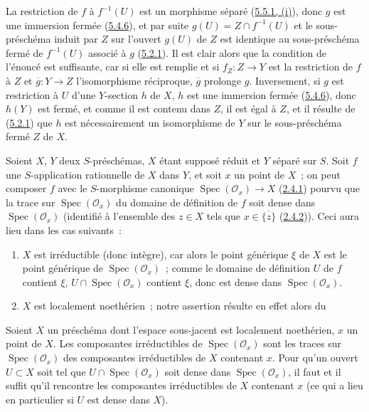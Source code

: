 La restriction de $f$ à $f^{-1}(U)$ est un morphisme séparé
(\hyperref[I.5.5.1-fr]{5.5.1, (i)}), donc $g$ est une immersion fermée
(\hyperref[I.5.4.6-fr]{5.4.6}), et par suite
$g(U)=Z\cap f^{-1}(U)$ et le sous-préschéma induit par $Z$ sur l'ouvert
$g(U)$ de $Z$ est identique au sous-préschéma fermé de $f^{-1}(U)$ associé à
$g$ (\hyperref[I.5.2.1-fr]{5.2.1}). Il est clair alors que la condition de
l'énoncé est suffisante, car si elle est remplie et si $f_Z:Z\to Y$ est la
restriction de $f$ à $Z$ et $\overline g:Y\to Z$ l'isomorphisme réciproque,
$\overline g$ prolonge $g$. Inversement, si $g$ est restriction à $U$ d'une
$Y$-section $h$ de $X$, $h$ est une immersion fermée
(\hyperref[I.5.4.6-fr]{5.4.6}), donc $h(Y)$ est fermé, et comme il est contenu
dans $Z$, il est égal à $Z$, et il résulte de
(\hyperref[I.5.2.1-fr]{5.2.1}) que $h$ est nécessairement un isomorphisme de
$Y$ sur le sous-préschéma fermé $Z$ de $X$.

\begin{env}[7.2.8]
\label{I.7.2.8-fr}
Soient $X$, $Y$ deux $S$-préschémas, $X$ étant supposé réduit et $Y$ séparé
sur $S$. Soit $f$ une $S$-application rationnelle de $X$ dans $Y$, et soit
$x$ un point de $X$~; on peut composer $f$ avec le $S$-morphisme canonique
$\operatorname{Spec}(\mathscr{O}_x)\to X$
(\hyperref[I.2.4.1-fr]{2.4.1}) pourvu que la trace sur
$\operatorname{Spec}(\mathscr{O}_x)$ du domaine de définition de $f$ soit
dense dans $\operatorname{Spec}(\mathscr{O}_x)$ (identifié à l'ensemble des
$z\in X$ tels que $x\in\overline{\{z\}}$
(\hyperref[I.2.4.2-fr]{2.4.2})). Ceci aura lieu dans les cas suivants~:
\begin{enumerate}
  \item[1\textsuperscript{o}] $X$ est irréductible (donc intègre), car alors
    le point générique $\xi$ de $X$ est le point générique de
    $\operatorname{Spec}(\mathscr{O}_x)$~; comme le domaine de définition $U$
    de $f$ contient $\xi$, $U\cap\operatorname{Spec}(\mathscr{O}_x)$ contient
    $\xi$, donc est dense dans $\operatorname{Spec}(\mathscr{O}_x)$.
  \item[2\textsuperscript{o}] $X$ est localement noethérien~; notre assertion
    résulte en effet alors du
\end{enumerate}
\end{env}

\begin{lemma}[7.2.8.1]
\label{I.7.2.8.1-fr}
Soient $X$ un préschéma dont l'espace sous-jacent est localement noethérien,
$x$ un point de $X$. Les composantes irréductibles de
$\operatorname{Spec}(\mathscr{O}_x)$ sont les traces sur
$\operatorname{Spec}(\mathscr{O}_x)$ des composantes irréductibles de $X$
contenant $x$. Pour qu'un ouvert $U\subset X$ soit tel que
$U\cap\operatorname{Spec}(\mathscr{O}_x)$ soit dense dans
$\operatorname{Spec}(\mathscr{O}_x)$, il faut et il suffit qu'il rencontre les
composantes irréductibles de $X$ contenant $x$ (ce qui a lieu en particulier
si $U$ est dense dans $X$).
\end{lemma}

